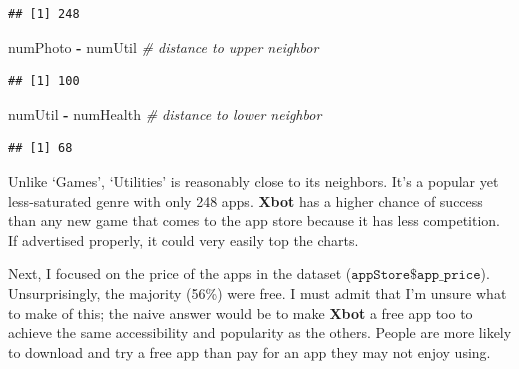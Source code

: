 \documentclass[]{article}
\newenvironment{Shaded}{\begin{snugshade}}{\end{snugshade}}
\newcommand{\KeywordTok}[1]{\textcolor[rgb]{0.13,0.29,0.53}{\textbf{#1}}}
\newcommand{\FloatTok}[1]{\textcolor[rgb]{0.00,0.00,0.81}{#1}}
\newcommand{\StringTok}[1]{\textcolor[rgb]{0.31,0.60,0.02}{#1}}
\newcommand{\CommentTok}[1]{\textcolor[rgb]{0.56,0.35,0.01}{\textit{#1}}}
\newcommand{\OperatorTok}[1]{\textcolor[rgb]{0.81,0.36,0.00}{\textbf{#1}}}
\newcommand{\NormalTok}[1]{#1}
\begin{document}
\begin{verbatim}
## [1] 248
\end{verbatim}

\begin{Shaded}
\begin{Highlighting}[]
\NormalTok{numPhoto }\OperatorTok{-}\StringTok{ }\NormalTok{numUtil               }\CommentTok{# distance to upper neighbor}
\end{Highlighting}
\end{Shaded}

\begin{verbatim}
## [1] 100
\end{verbatim}

\begin{Shaded}
\begin{Highlighting}[]
\NormalTok{numUtil }\OperatorTok{-}\StringTok{ }\NormalTok{numHealth              }\CommentTok{# distance to lower neighbor}
\end{Highlighting}
\end{Shaded}

\begin{verbatim}
## [1] 68
\end{verbatim}

Unlike `Games', `Utilities' is reasonably close to its neighbors. It's a
popular yet less-saturated genre with only 248 apps. \textbf{Xbot} has a
higher chance of success than any new game that comes to the app store
because it has less competition. If advertised properly, it could very
easily top the charts.

Next, I focused on the price of the apps in the dataset
(\(\texttt{appStore\$app\_price}\)). Unsurprisingly, the majority (56\%)
were free. I must admit that I'm unsure what to make of this; the naive
answer would be to make \textbf{Xbot} a free app too to achieve the same
accessibility and popularity as the others. People are more likely to
download and try a free app than pay for an app they may not enjoy
using.

\begin{Shaded}
\end{Shaded}
\end{document}
